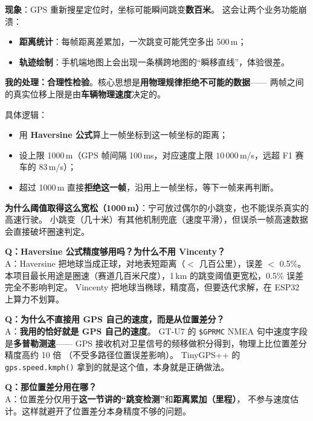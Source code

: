 \documentclass[UTF8,11pt,a4paper]{ctexart}
\begin{document}
\begin{candidate}
\textbf{现象}：GPS 重新搜星定位时，坐标可能瞬间跳变\textbf{数百米}。
这会让两个业务功能崩溃：
\begin{itemize}[leftmargin=1.4em,topsep=2pt,itemsep=2pt]
  \item \textbf{距离统计}：每帧距离差累加，一次跳变可能凭空多出 500\,m；
  \item \textbf{轨迹绘制}：手机端地图上会出现一条横跨地图的``瞬移直线''，体验很差。
\end{itemize}

\medskip
\textbf{我的处理：合理性检验}。核心思想是\textbf{用物理规律拒绝不可能的数据}——
两帧之间的真实位移上限是由\textbf{车辆物理速度}决定的。

\medskip
具体逻辑：
\begin{itemize}[leftmargin=1.4em,topsep=2pt,itemsep=2pt]
  \item 用 \textbf{Haversine 公式}算上一帧坐标到这一帧坐标的距离；
  \item 设上限 1000\,m（GPS 帧间隔 100\,ms，对应速度上限 $10\,000\,$m/s，远超 F1 赛车的 83\,m/s）；
  \item 超过 1000\,m 直接\textbf{拒绝这一帧}，沿用上一帧坐标，等下一帧来再判断。
\end{itemize}

\medskip
\textbf{为什么阈值取得这么宽松（1000\,m）}：宁可放过偶尔的小跳变，也不能误杀真实的高速行驶。
小跳变（几十米）有其他机制兜底（速度平滑），但误杀一帧高速数据会直接破坏圈速判定。
\end{candidate}

\begin{followup}
\textbf{Q：Haversine 公式精度够用吗？为什么不用 Vincenty？}\\
A：Haversine 把地球当成正球，对地表短距离（$<$ 几百公里），误差 $<$ 0.5\%。
本项目最长用途是圈速（赛道几百米尺度），1\,km 的跳变阈值更宽松，0.5\% 误差完全不影响判定。
Vincenty 把地球当椭球，精度高，但要迭代求解，在 ESP32 上算力不划算。

\medskip
\textbf{Q：为什么不直接用 GPS 自己的速度，而是从位置差分？}\\
A：\textbf{我用的恰好就是 GPS 自己的速度}。
GT-U7 的 \texttt{\$GPRMC} NMEA 句中速度字段是\textbf{多普勒测速}——
GPS 接收机对卫星信号的频移做积分得到，物理上比位置差分精度高约 10 倍
（不受多路径位置误差影响）。
TinyGPS++ 的 \texttt{gps.speed.kmph()} 拿到的就是这个值，本身就是正确做法。

\medskip
\textbf{Q：那位置差分用在哪？}\\
A：位置差分仅用于\textbf{这一节讲的``跳变检测''}和\textbf{距离累加（里程）}，
不参与速度估计。这样就避开了位置差分本身精度不够的问题。
\end{followup}
\end{document}
